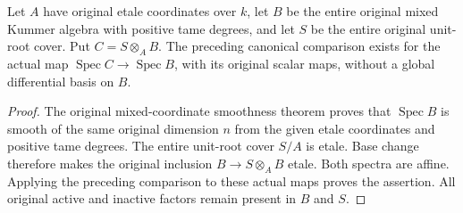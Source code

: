 \begin{lemma}
\label{lem:kn-global-trace-mixed-canonical-basechange}
\leanok
{}
Let $A$ have original etale coordinates over $k$, let $B$ be the entire
original mixed Kummer algebra with positive tame degrees, and let $S$ be
the entire original unit-root cover.  Put $C=S\otimes_A B$.  The preceding
canonical comparison exists for the actual map
$\operatorname{Spec}C\to\operatorname{Spec}B$, with its original scalar
maps, without a global differential basis on $B$.
\end{lemma}
\begin{proof}
The original mixed-coordinate smoothness theorem proves that
$\operatorname{Spec}B$ is smooth of the same original dimension $n$ from
the given etale coordinates and positive tame degrees.  The entire
unit-root cover $S/A$ is etale.  Base change therefore makes the original
inclusion $B\to S\otimes_A B$ etale.  Both spectra are affine.  Applying
the preceding comparison to these actual maps proves the assertion.  All
original active and inactive factors remain present in $B$ and $S$.
\end{proof}


